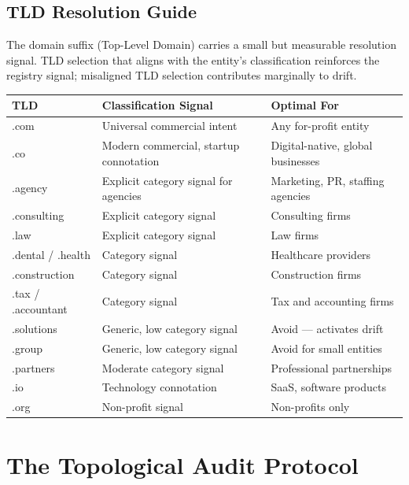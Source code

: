 \documentclass[12pt, openany]{book}
\theoremstyle{thmstyle}
\theoremstyle{defstyle}
\begin{document}
\section{TLD Resolution Guide}

The domain suffix (Top-Level Domain) carries a small but measurable resolution signal. TLD selection that aligns with the entity's classification reinforces the registry signal; misaligned TLD selection contributes marginally to drift.

\begin{center}
\begin{tabular}{lll}
\toprule
\textbf{TLD} & \textbf{Classification Signal} & \textbf{Optimal For} \\
\midrule
.com & Universal commercial intent & Any for-profit entity \\
.co & Modern commercial, startup connotation & Digital-native, global businesses \\
.agency & Explicit category signal for agencies & Marketing, PR, staffing agencies \\
.consulting & Explicit category signal & Consulting firms \\
.law & Explicit category signal & Law firms \\
.dental / .health & Category signal & Healthcare providers \\
.construction & Category signal & Construction firms \\
.tax / .accountant & Category signal & Tax and accounting firms \\
.solutions & Generic, low category signal & Avoid --- activates drift \\
.group & Generic, low category signal & Avoid for small entities \\
.partners & Moderate category signal & Professional partnerships \\
.io & Technology connotation & SaaS, software products \\
.org & Non-profit signal & Non-profits only \\
\bottomrule
\end{tabular}
\end{center}

\chapter{The Topological Audit Protocol}
\end{document}
